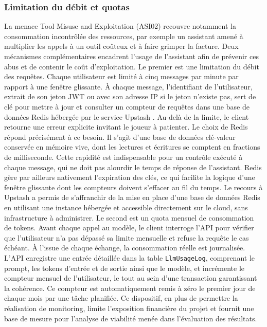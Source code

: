 \documentclass[12pt]{article}
\begin{document}
\subsubsection{Limitation du débit et quotas}
La menace Tool Misuse and Exploitation (ASI02) recouvre notamment la consommation incontrôlée des ressources, par exemple un assistant amené à multiplier les appels à un outil coûteux et à faire grimper la facture. Deux mécanismes complémentaires encadrent l'usage de l'assistant afin de prévenir ces abus et de contenir le coût d'exploitation.
\newline\newline
Le premier est une limitation du débit des requêtes. Chaque utilisateur est limité à cinq messages par minute par rapport à une fenêtre glissante. À chaque message, l'identifiant de l'utilisateur, extrait de son jeton JWT ou avec son adresse IP si le jeton n'existe pas, sert de clé pour mettre à jour et consulter un compteur de requêtes dans une base de données Redis hébergée par le service Upstash \parencite{upstash_redis_2026}. Au-delà de la limite, le client retourne une erreur explicite invitant le joueur à patienter.
\newline\newline
Le choix de Redis répond précisément à ce besoin. Il s'agit d'une base de données clé-valeur conservée en mémoire vive, dont les lectures et écritures se comptent en fractions de milliseconde. Cette rapidité est indispensable pour un contrôle exécuté à chaque message, qui ne doit pas alourdir le temps de réponse de l'assistant. Redis gère par ailleurs nativement l'expiration des clés, ce qui facilite la logique d'une fenêtre glissante dont les compteurs doivent s'effacer au fil du temps. Le recours à Upstash a permis de s'affranchir de la mise en place d'une base de données Redis en utilisant une instance hébergée et accessible directement sur le cloud, sans infrastructure à administrer.
\newline\newline
Le second est un quota mensuel de consommation de tokens. Avant chaque appel au modèle, le client interroge l'API pour vérifier que l'utilisateur n'a pas dépassé sa limite mensuelle et refuse la requête le cas échéant. À l'issue de chaque échange, la consommation réelle est journalisée. L'API enregistre une entrée détaillée dans la table \texttt{LlmUsageLog}, comprenant le prompt, les tokens d'entrée et de sortie ainsi que le modèle, et incrémente le compteur mensuel de l'utilisateur, le tout au sein d'une transaction garantissant la cohérence. Ce compteur est automatiquement remis à zéro le premier jour de chaque mois par une tâche planifiée. Ce dispositif, en plus de permettre la réalisation de monitoring, limite l'exposition financière du projet et fournit une base de mesure pour l'analyse de viabilité menée dans l'évaluation des résultats.
\end{document}
